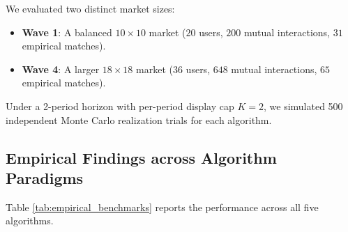 \documentclass[11pt,letterpaper]{article}
\theoremstyle{definition}
\theoremstyle{plain}
\theoremstyle{remark}
\begin{document}
We evaluated two distinct market sizes:
\begin{itemize}[leftmargin=2em]
    \item \textbf{Wave 1}: A balanced $10 \times 10$ market ($20$ users, $200$ mutual interactions, $31$ empirical matches).
    \item \textbf{Wave 4}: A larger $18 \times 18$ market ($36$ users, $648$ mutual interactions, $65$ empirical matches).
\end{itemize}
Under a 2-period horizon with per-period display cap $K=2$, we simulated 500 independent Monte Carlo realization trials for each algorithm.

\subsection{Empirical Findings across Algorithm Paradigms}
Table \ref{tab:empirical_benchmarks} reports the performance across all five algorithms.
\end{document}
